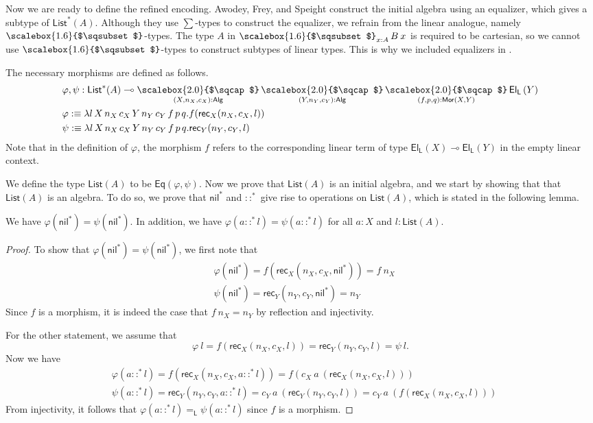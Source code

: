 \documentclass[a4paper,UKenglish,cleveref,numberwithinsect, autoref, thm-restate]{lipics-v2021}
\newcommand{\lin}{\multimap}
\newcommand{\Sqcap}{%
  \mathop{%
    \mathchoice
      {\scalebox{2.0}{$\sqcap$}}%
      {\scalebox{1.6}{$\sqcap$}}%
      {\scalebox{1.2}{$\sqcap$}}%
      {\scalebox{1.0}{$\sqcap$}}%
  }\displaylimits
}
\newcommand{\Sqsubset}{%
  \mathop{%
    \mathchoice
      {\scalebox{2.0}{$\sqsubset$}}%
      {\scalebox{1.6}{$\sqsubset$}}%
      {\scalebox{1.2}{$\sqsubset$}}%
      {\scalebox{1.0}{$\sqsubset$}}%
  }\displaylimits
}
\newcommand{\LSigSym}{\mathop{\Sqsubset}}
\newcommand{\LSig}[2]{\LSigSym_{#1} #2}
\newcommand{\LPiSym}{\mathop{\Sqcap}}
\newcommand{\LPi}[2]{\LPiSym_{#1} #2}
\newcommand{\LEq}[2]{\mathsf{Eq}(#1, #2)}
\newcommand{\El}{\mathsf{El}}
\newcommand{\ElL}[1]{\El_{\mathsf{L}}\left(#1\right)}
\newcommand{\ListI}[1]{\mathsf{List}^*(#1)}
\newcommand{\List}[1]{\mathsf{List}(#1)}
\newcommand{\NilI}{\mathsf{nil}^*}
\newcommand{\ConsSym}{::}
\newcommand{\ConsI}[2]{#1 \ConsSym^* #2}
\newcommand{\Rec}[4]{\mathsf{rec}_{#1}(#2, #3, #4)}
\newcommand{\Alg}{\mathsf{Alg}}
\newcommand{\Mor}[2]{\mathsf{Mor}(#1, #2)}
\newcommand{\defeq}{\mathrel{:\equiv}}
\newcommand{\lineq}[2]{#1 =_\mathsf{L} #2}
\begin{document}
Now we are ready to define the refined encoding.
Awodey, Frey, and Speight construct the initial algebra using an equalizer,
which gives a subtype of  $\ListI{A}$.
Although they use $\sum$-types to construct the equalizer,
we refrain from the linear analogue,
namely $\LSigSym$-types.
The type $A$ in $\LSig{x : A}{B  \> x}$ is required to be cartesian,
so we cannot use $\LSigSym$-types to construct subtypes of linear types.
This is why we included equalizers in .

The necessary morphisms are defined as follows.
\begin{align*}
&\varphi , \psi : \ListI{A} \lin
\LPi{(X, n_X, c_X) : \Alg}{\LPi{(Y, n_Y, c_Y) : \Alg}{\LPi{(f, p, q) : \Mor{X}{Y}}{\ElL{Y}}}}
\\
&\varphi \defeq \lambda l \, X \, n_X \, c_X \, Y \, n_Y \, c_Y \, f \, p \, q.
f(\Rec{X}{n_X}{c_X}{l})
\\
&\psi \defeq \lambda l \, X \, n_X \, c_X \, Y \, n_Y \, c_Y \, f \, p \, q.
\Rec{Y}{n_Y}{c_Y}{l}
\end{align*}
Note that in the definition of $\varphi$,
the morphism $f$ refers to the corresponding linear term of type $\ElL{X} \lin \ElL{Y}$ in the empty linear context.

We define the type $\List{A}$ to be $\LEq{\varphi}{\psi}$.
Now we prove that $\List{A}$ is an initial algebra,
and we start by showing that that $\List{A}$ is an algebra.
To do so,
we prove that $\NilI$ and $::^*$ give rise to operations on $\List{A}$,
which is stated in the following lemma.

\begin{lemma}
\label{lem:list-alg}
We have $\varphi(\NilI) = \psi(\NilI)$.
In addition,
we have $\varphi(\ConsI{a}{l}) = \psi(\ConsI{a}{l})$
for all $a : X$ and $l : \List{A}$.
\end{lemma}

\begin{proof}
To show that $\varphi(\NilI) = \psi(\NilI)$,
we first note that
\begin{align*}
&\varphi(\NilI) = f(\Rec{X}{n_X}{c_X}{\NilI}) = f \> n_X
\\
&\psi(\NilI) = \Rec{Y}{n_Y}{c_Y}{\NilI} = n_Y
\end{align*}
Since $f$ is a morphism,
it is indeed the case that $f \> n_X = n_Y$ by reflection and injectivity.

For the other statement, we assume that
\[
\varphi \> l = f(\Rec{X}{n_X}{c_X}{l}) = \Rec{Y}{n_Y}{c_Y}{l} = \psi \> l.
\]
Now we have
\begin{align*}
&\varphi(\ConsI{a}{l}) = f(\Rec{X}{n_X}{c_X}{\ConsI{a}{l}}) = f(c_X \> a \> (\Rec{X}{n_X}{c_X}{l}))
\\
&\psi(\ConsI{a}{l}) = \Rec{Y}{n_Y}{c_Y}{\ConsI{a}{l}} = c_Y \> a \> (\Rec{Y}{n_Y}{c_Y}{l}) = c_Y \> a \> (f(\Rec{X}{n_X}{c_X}{l}))
\end{align*}
From injectivity,
it follows that $\lineq{\varphi(\ConsI{a}{l})}{\psi(\ConsI{a}{l})}$
since $f$ is a morphism.
\end{proof}
\end{document}
